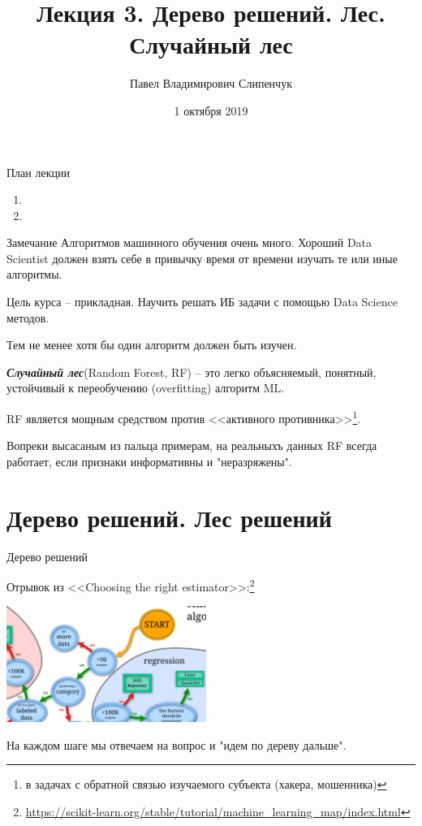 \documentclass{beamer}
\title{Лекция 3. Дерево решений. Лес. Случайный лес}
\date{1 октября 2019}
\author{Павел Владимирович Слипенчук}
\institute{Москва, МГТУ им.Бауманка,\\ каф.ИУ-8, КИБ}
\newcommand{\termdef}[1]{\textbf{\textit{#1}}}
\begin{document}
  \maketitle
    
  \begin{frame}{План лекции}
    \begin{enumerate}
	 \item {}
	 \item {}
	\end{enumerate}
 \end{frame}
    
  \begin{frame}
  \begin{block}{Замечание}
  	Алгоритмов машинного обучения очень много. 
  	Хороший Data Scientist должен взять себе в привычку
  	время от времени изучать те или иные алгоритмы.
  	
  	Цель курса -- прикладная. Научить решать ИБ задачи с помощью
  	Data Science методов.
  	
  	Тем не менее хотя бы один алгоритм должен быть изучен.
  \end{block}
 \end{frame}
  \begin{frame}
  \termdef{Случайный лес}(Random Forest, RF) -- это легко объясняемый, 
  понятный, 
  устойчивый к переобучению (overfitting)
  алгоритм ML.
  
  RF является мощным средством против <<активного противника>>\footnote{
  в задачах с обратной связью изучаемого субъекта (хакера, мошенника)
  }. 

  Вопреки высасаным из пальца примерам, на реальныхъ данных
  RF всегда работает, если признаки информативны и "неразряжены".
  \end{frame}

   \section{Дерево решений. Лес решений}\label{section:tree_forest}
	

  \begin{frame}{Дерево решений}
  
  Отрывок из <<Choosing the right estimator>>:\footnote{\tiny \url{https://scikit-learn.org/stable/tutorial/machine_learning_map/index.html}}
  \begin{center}
  	\includegraphics[width=6.5cm]{../pic/scikit_desicion_tree.png}\centering
  \end{center}
  На каждом шаге мы отвечаем на вопрос и "идем по дереву дальше".
  \end{frame}
\end{document}
